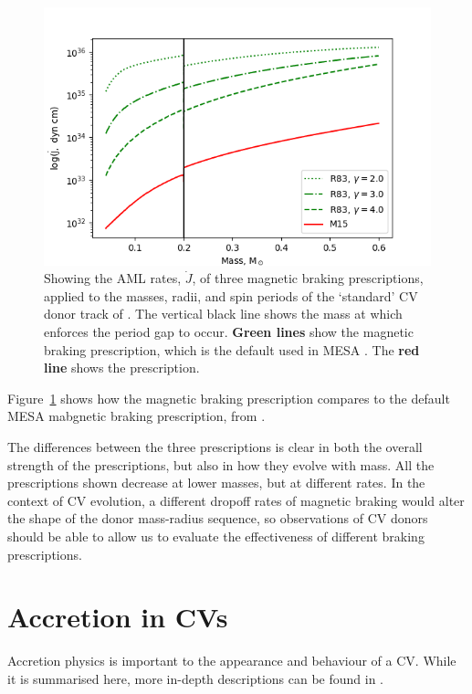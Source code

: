 \begin{figure}
    \centering
    \includegraphics[width=\textwidth, trim={1cm 0 0 0}]{figures/introduction/rappaport_matt_magbraking.png}
    \caption{Showing the AML rates, $\dot J$, of three magnetic braking prescriptions, applied to the masses, radii, and spin periods of the `standard' CV donor track of \citet{knigge11}. The vertical black line shows the mass at which \citet{knigge11} enforces the period gap to occur. {\bf Green lines} show the \citet{rappaport1983} magnetic braking prescription, which is the default used in MESA \citep{Paxton_2015}. The {\bf red line} shows the \citet{matt2015} prescription.}
    \label{fig:introduction:rappaport garraffo matt magnetic braking}
\end{figure}

Figure~\ref{fig:introduction:rappaport garraffo matt magnetic braking} shows how the \citet{matt2015} magnetic braking prescription compares to the default MESA mabgnetic braking prescription, from \citet{rappaport1983}. 

The differences between the three prescriptions is clear in both the overall strength of the prescriptions, but also in how they evolve with mass. All the prescriptions shown decrease at lower masses, but at different rates. In the context of CV evolution, a different dropoff rates of magnetic braking would alter the shape of the donor mass-radius sequence, so observations of CV donors should be able to allow us to evaluate the effectiveness of different braking prescriptions.


\section{Accretion in CVs}
\label{sect:introduction:accretion}
Accretion physics is important to the appearance and behaviour of a CV. While it is summarised here, more in-depth descriptions can be found in \citet{warner1995, hellier2001, ritter2010}.

